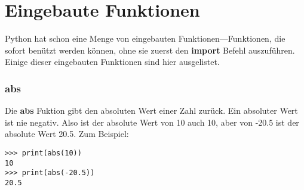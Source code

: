 

\chapter{Eingebaute Funktionen}\label{app:builtinfunctions}

Python hat schon eine Menge von eingebauten Funktionen---Funktionen, die sofort benützt werden können, ohne sie zuerst den \textbf{import} Befehl auszuführen. Einige dieser eingebauten Funktionen sind hier ausgelistet.

\subsection*{abs}

Die \textbf{abs} Fuktion gibt den absoluten Wert einer Zahl zurück. Ein absoluter Wert ist nie negativ. Also ist der absolute Wert von 10 auch 10, aber von -20.5 ist der absolute Wert 20.5. Zum Beispiel:

\begin{Verbatim}[frame=single]
>>> print(abs(10))
10
>>> print(abs(-20.5))
20.5
\end{Verbatim}

